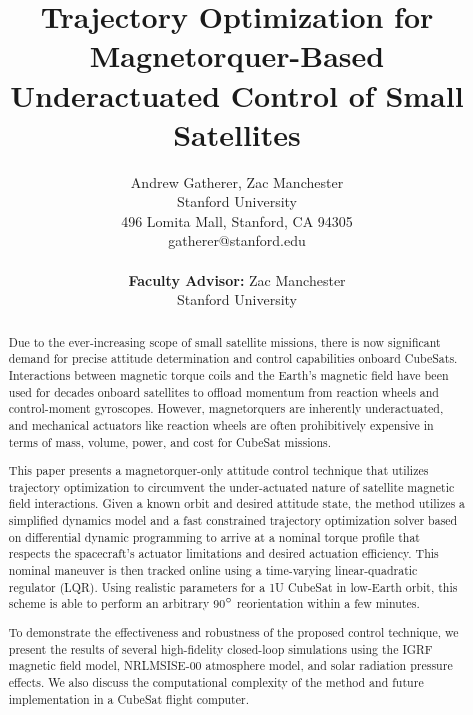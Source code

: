 \documentclass[10pt,notitlepage,twocolumn]{article}
\begin{document}
\title{Trajectory Optimization for Magnetorquer-Based Underactuated Control of Small Satellites}
\author{Andrew Gatherer, Zac Manchester\\
Stanford University \\
496 Lomita Mall, Stanford, CA 94305\\
gatherer@stanford.edu\\
\\
\textbf{Faculty Advisor:} Zac Manchester\\
Stanford University}
\maketitle

\begin{abstract}
Due to the ever-increasing scope of small satellite missions, there is now significant demand for precise attitude determination and control capabilities onboard CubeSats. Interactions between magnetic torque coils and the Earth's magnetic field have been used for decades onboard satellites to offload momentum from reaction wheels and control-moment gyroscopes. However, magnetorquers are inherently underactuated, and mechanical actuators like reaction wheels are often prohibitively expensive in terms of mass, volume, power, and cost for CubeSat missions.

This paper presents a magnetorquer-only attitude control technique that utilizes trajectory optimization to circumvent the under-actuated nature of satellite magnetic field interactions. Given a known orbit and desired attitude state, the method utilizes a simplified dynamics model and a fast constrained trajectory optimization solver based on differential dynamic programming to arrive at a nominal torque profile that respects the spacecraft's actuator limitations and desired actuation efficiency. This nominal maneuver is then tracked online using a time-varying linear-quadratic regulator (LQR). Using realistic parameters for a 1U CubeSat in low-Earth orbit, this scheme is able to perform an arbitrary 90$\degree$ reorientation within a few minutes.

To demonstrate the effectiveness and robustness of the proposed control technique, we present the results of several high-fidelity closed-loop simulations using the IGRF magnetic field model, NRLMSISE-00 atmosphere model, and solar radiation pressure effects. We also discuss the computational complexity of the method and future implementation in a CubeSat flight computer.
\end{abstract}
\end{document}
